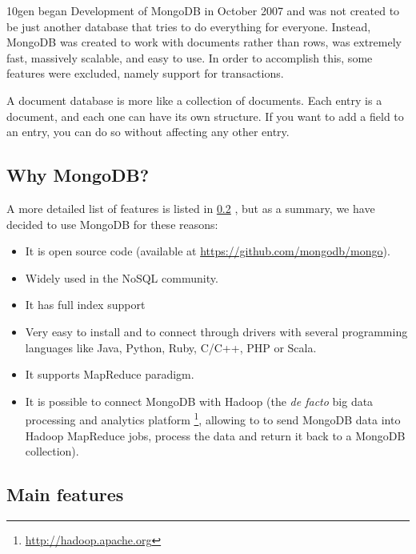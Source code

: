 10gen began Development of MongoDB in October 2007 and was not created to be just another database that tries to do everything for everyone. Instead, MongoDB was created to work with documents rather than rows, was extremely fast, massively scalable, and easy to use. In order to accomplish this, some features were excluded, namely support for transactions. 

A document database is more like a collection of documents. Each entry is a document, and each one can have its own structure. If you want to add a field to an entry, you can do so without affecting any other entry.



\subsection{Why MongoDB?}

A more detailed list of features is listed in \ref{features_mongo} , but as a summary, we have decided to use MongoDB for these reasons:

\begin{itemize}
\item It is open source code (available at \url{https://github.com/mongodb/mongo}).
\item Widely used in the NoSQL community.
\item It has full index support
\item Very easy to install and to connect through drivers with several programming languages like Java, Python, Ruby, C/C++, PHP or Scala.
\item It supports MapReduce paradigm.
\item It is possible to connect MongoDB with Hadoop (the \textit{de facto} big data processing and analytics platform \footnote{\url{http://hadoop.apache.org}}, allowing to to send MongoDB data into Hadoop MapReduce jobs, process the data and return it back to a MongoDB collection).
\end{itemize}

\subsection{Main features} \label{features_mongo}

